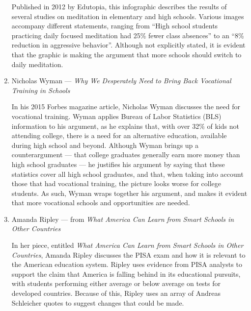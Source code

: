 \documentclass[12pt]{article}
\begin{document}
\begin{enumerate}
        \begin{justify}
          Published in 2012 by Edutopia, this infographic describes the results of several studies on meditation in elementary and high schools. Various images accompany different statements, ranging from “High school students practicing daily focused meditation had 25\% fewer class absences” to an “8\% reduction in aggressive behavior”. Although not explicitly stated, it is evident that the graphic is making the argument that more schools should switch to daily meditation.
        \end{justify}

      \item Nicholas Wyman — \textit{Why We Desperately Need to Bring Back Vocational Training in Schools}

        \begin{justify}
          In his 2015 Forbes magazine article, Nicholas Wyman discusses the need for vocational training. Wyman applies Bureau of Labor Statistics (BLS) information to his argument, as he explains that, with over 32\% of kids not attending college, there is a need for an alternative education, available during high school and beyond. Although Wyman brings up a counterargument — that college graduates generally earn more money than high school graduates — he justifies his argument by saying that these statistics cover all high school graduates, and that, when taking into account those that had vocational training, the picture looks worse for college students. As such, Wyman wraps together his argument, and makes it evident that more vocational schools and opportunities are needed.
        \end{justify}

      \item Amanda Ripley — from \textit{What America Can Learn from Smart Schools in Other Countries}

        \begin{justify}
          In her piece, entitled \textit{What America Can Learn from Smart Schools in Other Countries}, Amanda Ripley discusses the PISA exam and how it is relevant to the American education system. Ripley uses evidence from PISA analysts to support the claim that America is falling behind in its educational pursuits, with students performing either average or below average on tests for developed countries. Because of this, Ripley uses an array of Andreas Schleicher quotes to suggest changes that could be made.
        \end{justify}


\end{enumerate}
\end{document}
